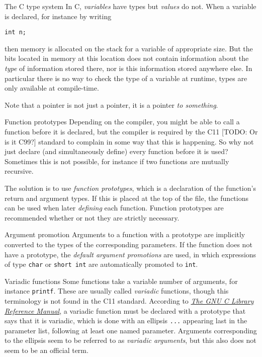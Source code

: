 \documentclass[article, a4paper, 11pt, oneside]{memoir}
\numberwithin{equation}{chapter}
\newcommand{\inlinecode}[1]{\colorbox{lightgray}{\vphantom{\texttt{jk}}\lstinline$#1$}}
\renewcommand{\inlinecode}{\lstinline}
\begin{document}
\begin{notelist}
\item[The C type system]
In C, \emph{variables} have types but \emph{values} do not. When a variable is declared, for instance by writing
%
\begin{displayquote}
    \lstinline{int n;}
\end{displayquote}
%
then memory is allocated on the stack for a variable of appropriate size. But the bits located in memory at this location does not contain information about the \emph{type} of information stored there, nor is this information stored anywhere else. In particular there is no way to check the type of a variable at runtime, types are only available at compile-time.

Note that a pointer is not just a pointer, it is a pointer \emph{to something}.

\item[Function prototypes]
Depending on the compiler, you might be able to call a function before it is declared, but the compiler is required by the C11 [TODO: Or is it C99?] standard to complain in some way that this is happening. So why not just declare (and simultaneously define) every function before it is used? Sometimes this is not possible, for instance if two functions are mutually recursive.

The solution is to use \emph{function prototypes}, which is a declaration of the function's return and argument types. If this is placed at the top of the file, the functions can be used when later \emph{defining} each function. Function prototypes are recommended whether or not they are strictly necessary.

\item[Argument promotion]
Arguments to a function with a prototype are implicitly converted to the types of the corresponding parameters. If the function does not have a prototype, the \emph{default argument promotions} are used, in which expressions of type \inlinecode{char} or \inlinecode{short int} are automatically promoted to \inlinecode{int}.

\item[Variadic functions]
Some functions take a variable number of arguments, for instance \inlinecode{printf}. These are usually called \emph{variadic} functions, though this terminology is not found in the C11 standard. According to \emph{\href{https://www.gnu.org/software/libc/manual/html_node/Variadic-Prototypes.html}{The GNU C Library Reference Manual}}, a variadic function must be declared with a prototype that says that it is variadic, which is done with an ellipsis \inlinecode{...} appearing last in the parameter list, following at least one named parameter. Arguments corresponding to the ellipsis seem to be referred to as \emph{variadic arguments}, but this also does not seem to be an official term.


\end{notelist}
\end{document}
